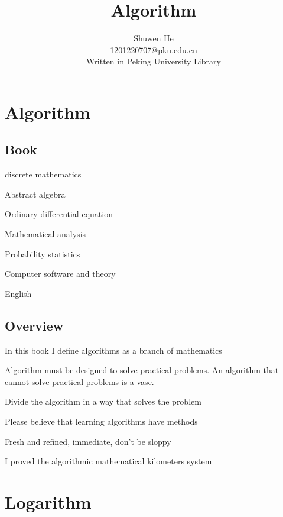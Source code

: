 \documentclass[oneside,12pt,twiside,a4paper]{ctexbook}
\begin{document}
\author
{
Shuwen He\\
1201220707@pku.edu.cn\\
Written in Peking University Library
}

\title{Algorithm}
\maketitle
\tableofcontents


%
\chapter{Algorithm}
\section{Book}
discrete mathematics

Abstract algebra

Ordinary differential equation

Mathematical analysis

Probability statistics

Computer software and theory

English

\section{Overview}
In this book I define algorithms as a branch of mathematics

Algorithm must be designed to solve practical problems. An algorithm that cannot solve practical problems is a vase.

Divide the algorithm in a way that solves the problem

Please believe that learning algorithms have methods

Fresh and refined, immediate, don't be sloppy

I proved the algorithmic mathematical kilometers system
%
\chapter{Logarithm}
\end{document}
